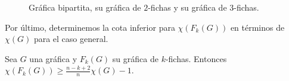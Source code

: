 \begin{figure}[ht!]
    \caption{Gr\'afica bipartita, su gr\'afica de $2$-fichas y su gr\'afica de $3$-fichas.}
    \label{fig:ex-bip}
\end{figure}

\pagebreak

Por \'ultimo, determinemos la cota inferior para $\chi (F_k(G))$ en t\'erminos de $\chi (G)$
para el caso general.

    \begin{teorema}
        \label{teo:numCrom-k}
            Sea $G$ una gr\'afica y $F_k(G)$ su gr\'afica de $k$-fichas.
            Entonces $\chi(F_k(G)) \geq \frac{n-k+2}{n} \chi(G) -1$.
        \end{teorema}
        
